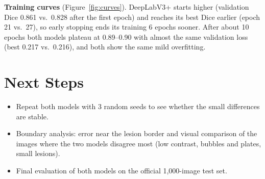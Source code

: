 \documentclass[11pt,a4paper]{article}
\begin{document}
\textbf{Training curves} (Figure~\ref{fig:curves}). DeepLabV3+ starts higher (validation Dice 0.861
vs.\ 0.828 after the first epoch) and reaches its best Dice earlier (epoch 21 vs.\ 27), so early
stopping ends its training 6 epochs sooner. After about 10 epochs both models plateau at
0.89--0.90 with almost the same validation loss (best 0.217 vs.\ 0.216), and both show the same mild
overfitting.

\section{Next Steps}

\begin{itemize}[noitemsep]
\item Repeat both models with 3 random seeds to see whether the small differences are stable.
\item Boundary analysis: error near the lesion border and visual comparison of the images where
the two models disagree most (low contrast, bubbles and plates, small lesions).
\item Final evaluation of both models on the official 1,000-image test set.
\end{itemize}
\end{document}
